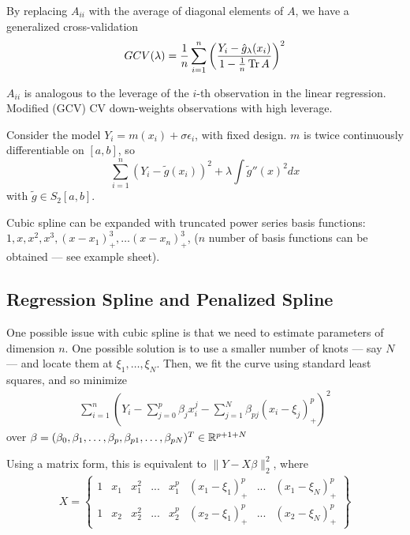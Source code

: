 By replacing $A_{ii}$ with the average of diagonal elements of $A$, we
have a generalized cross-validation
\begin{equation}
  \label{eq:81}
  GCV(\lambda) = \frac{1}{n} \sum_{i=1}^{n} \left(\frac{Y_{i} - \hat
    g_{\lambda}(x_{i})}{1 - \frac{1}{n} \operatorname*{Tr}{A}} \right)^{2}
\end{equation}

$A_{ii}$ is analogous to the leverage of the $i$-th observation in the
linear regression.  Modified (GCV) CV down-weights observations with
high leverage.

Consider the model $Y_{i} = m(x_{i}) + \sigma \epsilon_{i}$, with
fixed design.  $m$ is twice continuously differentiable on $[a, b]$, so
\begin{equation}
  \label{eq:82}
  \sum_{i=1}^{n} (Y_{i} - \tilde g(x_{i}))^{2} + \lambda \int \tilde
  g''(x)^{2} dx
\end{equation} with $\tilde g \in S_{2}[a, b]$.

Cubic spline can be expanded with truncated power series basis
functions: $1, x, x^{2}, x^{3}, (x - x_{1})^{3}_{+}, \dots (x -
x_{n})^{3}_{+}$, ($n$ number of basis functions can be obtained ---
see example sheet).

\subsection{Regression Spline and Penalized Spline}
\label{sec:regr-spline-penal}

One possible issue with cubic spline is that we need to estimate
parameters of dimension $n$.  One possible solution is to use a
smaller number of knots --- say $N$ --- and locate them at $\xi_{1},
\dots, \xi_{N}$. Then, we fit the curve using standard least squares,
and so minimize
\begin{align}
  \label{eq:83}
  \sum_{i=1}^{n} (Y_{i} - \sum_{j=0}^{p} \beta_{j} x_{i}^{j} -
  \sum_{j=1}^{N} \beta_{pj} (x_{i} - \xi_{j})_{+}^{p})^{2}
\end{align} over $\beta = (\beta_{0}, \beta_{1}, \dots, \beta_{p},
\beta_{p1}, \dots, \beta_{pN})^{T} \in \mathbb{R}^{p + 1 + N}$

Using a matrix form, this is equivalent to $\| Y - X \beta
\|_{2}^{2}$, where
\begin{align}
  \label{eq:84}
  X =
  \begin{Bmatrix}
    1 & x_{1} & x_{1}^{2} & ... & x_{1}^{p} & (x_{1} -
    \xi_{1})_{+}^{p} & ... & (x_{1} - \xi_{N})_{+}^{p} \\
    1 & x_{2} & x_{2}^{2} & ... & x_{2}^{p} & (x_{2} -
    \xi_{1})_{+}^{p} & ... & (x_{2} - \xi_{N})_{+}^{p}
  \end{Bmatrix}
\end{align}

